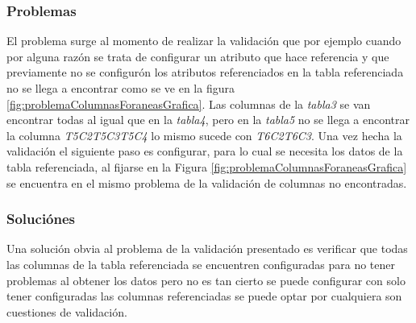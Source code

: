 \subsubsection{Problemas}
El problema surge al momento de realizar la validaci\'on que por ejemplo cuando por alguna raz\'on se trata de configurar un atributo que hace referencia y que previamente no se configur\'on los atributos referenciados en la tabla referenciada no se llega a encontrar como se ve en la figura \ref{fig:problemaColumnasForaneasGrafica}. Las columnas de la \textit{tabla3} se van encontrar todas al igual que en la \textit{tabla4}, pero en la \textit{tabla5} no se llega a encontrar la columna \textit{T5C2T5C3T5C4} lo mismo sucede con \textit{T6C2T6C3}.
Una vez hecha la validaci\'on el siguiente paso es configurar, para lo cual se necesita los datos de la tabla referenciada, al fijarse en la Figura \ref{fig:problemaColumnasForaneasGrafica} se encuentra en el mismo problema de la validaci\'on de columnas no encontradas.   
\subsubsection{Soluci\'ones}
Una soluci\'on obvia al problema de la validaci\'on presentado es verificar que todas las columnas de la tabla referenciada se encuentren configuradas para no tener problemas al obtener los datos pero no es tan cierto se puede configurar con solo tener configuradas las columnas referenciadas se puede optar por cualquiera son cuestiones de validaci\'on.

